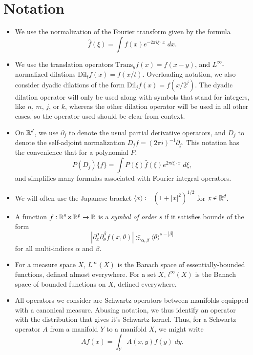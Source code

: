 
\chapter*{Notation}

\begin{itemize}
    \item We use the normalization of the Fourier transform given by the formula
    \[ \widehat{f}(\xi) = \int f(x) e^{- 2 \pi i \xi \cdot x}\; dx. \]

    \item We use the translation operators $\text{Trans}_y f(x) = f(x - y)$, and $L^\infty$-normalized dilations $\text{Dil}_t f(x) = f(x/t)$. Overloading notation, we also consider dyadic dilations of the form $\text{Dil}_j f(x) = f(x/2^j)$. The dyadic dilation operator will only be used along with symbols that stand for integers, like $n$, $m$, $j$, or $k$, whereas the other dilation operator will be used in all other cases, so the operator used should be clear from context.

    \item On $\operatorname{\mathbb{R}}^d$, we use $\partial_j$ to denote the usual partial derivative operators, and $D_j$ to denote the self-adjoint normalization $D_j f = (2 \pi i)^{-1} \partial_j$. This notation has the convenience that for a polynomial $P$,
    \[ P(D_j) \{ f \} = \int P(\xi) \widehat{f}(\xi) e^{2 \pi i \xi \cdot x}\; d\xi, \]
    and simplifies many formulas associated with Fourier integral operators.

    \item We will often use the Japanese bracket $\langle x \rangle \coloneqq (1 + |x|^2)^{1/2}$ for $x \in \operatorname{\mathbb{R}}^d$.

    \item A function $f: \operatorname{\mathbb{R}}^n \times \operatorname{\mathbb{R}}^p \to \operatorname{\mathbb{R}}$ is a \emph{symbol of order $s$} if it satisfies bounds of the form
    \[ | \partial_x^\alpha \partial_\theta^\beta f (x,\theta) | \lesssim_{\alpha,\beta} \langle \theta \rangle^{s - |\beta|} \]
    for all multi-indices $\alpha$ and $\beta$.

    \item For a measure space $X$, $L^\infty(X)$ is the Banach space of essentially-bounded functions, defined almost everywhere. For a set $X$, $l^\infty(X)$ is the Banach space of bounded functions on $X$, defined everywhere.

    \item All operators we consider are Schwartz operators between manifolds equipped with a canonical measure. Abusing notation, we thus identify an operator with the distribution that gives it's Schwartz kernel. Thus, for a Schwartz operator $A$ from a manifold $Y$ to a manifold $X$, we might write
    \[ A f(x) = \int_Y A(x,y) f(y)\; dy. \]


\end{itemize}
